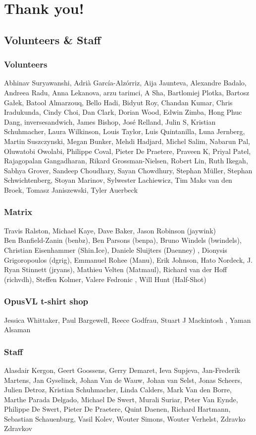\documentclass[aspectratio=169]{beamer}
\begin{document}
\section{Thank you!}

\subsection{Volunteers \& Staff}

\begin{frame}
	\frametitle{Volunteers}
	Abhinav Suryawanshi, Adrià García-Alzórriz, Aija Jaunteva, Alexandre Badalo, Andreea Radu, Anna Lekanova, arzu tarimci, A Sha, Bartlomiej Plotka, Bartosz Gałek, Batool Almarzouq, Bello Hadi, Bidyut Roy, Chandan Kumar, Chris Iradukunda, Cindy Choi, Dan Clark, Dorian Wood, Edwin Zimba, Hong Phuc Dang, inversesandwich, James Bishop, José Relland, Julin S, Kristian Schuhmacher, Laura Wilkinson, Louis Taylor, Luis Quintanilla, Luna Jernberg, Martin Suszczynski, Megan Bunker, Mehdi Hadjard, Michel Salim, Nabarun Pal, Oluwatobi Owolabi, Philippe Coval, Pieter De Praetere, Praveen K, Priyal Patel, Rajagopalan Gangadharan, Rikard Grossman-Nielsen, Robert Lin, Ruth Ikegah, Sabhya Grover, Sandeep Choudhary, Sayan Chowdhury, Stephan Müller, Stephan Schwichtenberg, Stoyan Marinov, Sylwester Lachiewicz, Tim Maks van den Broek, Tomasz Janiszewski, Tyler Auerbeck
\end{frame}

\begin{frame}
	\frametitle{Matrix}
	\vfill
	Travis Ralston, Michael Kaye, Dave Baker, Jason Robinson (jaywink)\\
	\vfill
	Ben Banfield-Zanin (benbz), Ben Parsons (benpa), Bruno Windels (bwindels), Christian Eisenhammer (Shin.Ice), Daniele Sluijters (Daenney) , Dionysis Grigoropoulos (dgrig), Emmanuel Rohee (Manu), Erik Johnson, Hato Nordeck, J. Ryan Stinnett (jryans), Mathieu Velten (Matmaul), Richard van der Hoff (richvdh), Steffen Kolmer, Valere Fedronic , Will Hunt (Half-Shot)
	\vfill
\end{frame}

\begin{frame}
	\frametitle{OpusVL t-shirt shop}
	Jessica Whittaker, Paul Bargewell, Reece Godfrau, Stuart J Mackintosh , Yaman Alsaman
\end{frame}

\begin{frame}
	\frametitle{Staff}
	\vfill
	Alasdair Kergon, Geert Goossens, Gerry Demaret, Ieva Supjeva, Jan-Frederik Martens, Jan Gyselinck, Johan Van de Wauw, Johan van Selst, Jonas Scheers, Julien Detroz, Kristian Schuhmacher, Linda Calders, Mark Van den Borre, Marthe Parada Delgado, Michael De Swert, Murali Suriar, Peter Van Eynde, Philippe De Swert, Pieter De Praetere, Quint Daenen, Richard Hartmann, Sebastian Schauenburg, Vasil Kolev, Wouter Simons, Wouter Verhelst, Zdravko Zdravkov
	\vfill
\end{frame}
\end{document}
